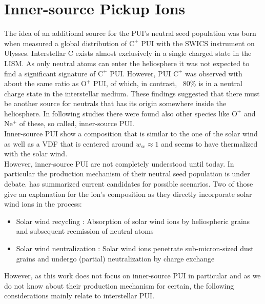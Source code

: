 \section{Inner-source Pickup Ions}
The idea of an additional source for the PUI's neutral seed population was born when \citet{geiss_1995a} measured a global distribution of $\mathrm{C^{+}}$ PUI with the SWICS instrument on Ulysses.  Interstellar $\mathrm{C}$ exists almost exclusively in a single charged state \citep{Frisch} in the LISM. As only neutral atoms can enter the heliosphere it was not expected to find a significant signature of $\mathrm{C^{+}}$ PUI. However, PUI $\mathrm{C^{+}}$ was observed with about the same ratio as $\mathrm{O^{+}}$ PUI, of which, in contrast, ~80\% is in a neutral charge state in the interstellar medium. These findings suggested that there must be another source for neutrals that has its origin somewhere inside the heliosphere. In following studies \citep[e.g.][]{geiss_1995b} there were found also other species like $\mathrm{O^{+}}$ and $\mathrm{Ne^{+}}$ of these, so called, inner-source PUI.\\
Inner-source PUI show a composition that is similar to the one of the solar wind \citep{gloeckler2000_innersource, allegrini_2005} as well as a VDF that is centered around $w_{\mathrm{sc}} \approx 1$ \citep{schwadron_2000} and seems to have thermalized with the solar wind.
\\
However, inner-source PUI are not completely understood until today. In particular the production mechanism of their neutral seed population is under debate. \citet{allegrini_2005} has summarized current candidates for possible scenarios. Two of those give an explanation for the ion's composition as they directly incorporate solar wind ions in the process:
\begin{itemize}
	\item Solar wind recycling \citep{gloeckler2000_innersource, schwadron_2000}: Absorption of solar wind ions by heliospheric grains and subsequent reemission of neutral atoms
	\item Solar wind neutralization \citep{wimmer_2002}: Solar wind ions penetrate sub-micron-sized dust grains and undergo (partial) neutralization by charge exchange
\end{itemize}
However, as this work does not focus on inner-source PUI in particular and as we do not know about their production mechanism for certain, the following considerations mainly relate to interstellar PUI.
%
%
%
